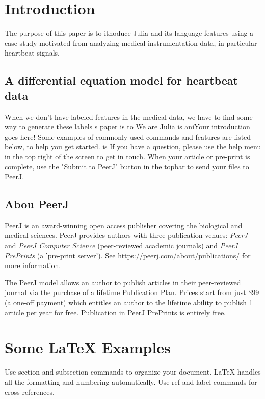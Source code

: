\documentclass[fleqn,10pt,lineno]{wlpeerj} %
\begin{document}
\section*{Introduction}

The purpose of this paper is to itnoduce Julia and its language features using a case study motivated from analyzing medical instrumentation data, in particular heartbeat signals.

\subsection{A differential equation model for heartbeat data}

When we don't have labeled features in the medical data, we have to find some way to generate these labels
s paper is to We are Julia is aniYour introduction goes here! Some examples of commonly used commands and features are listed below, to help you get started.
is
If you have a question, please use the help menu in the top right of the screen to get in touch. When your article or pre-print is complete, use the "Submit to PeerJ" button in the topbar to send your files to PeerJ.

\subsection*{Abou PeerJ}

PeerJ is an award-winning open access publisher covering the biological and medical sciences.  PeerJ provides authors with three publication venues: \textit{PeerJ} and \textit{PeerJ Computer Science} (peer-reviewed academic journals) and \textit{PeerJ PrePrints} (a 'pre-print server'). See https://peerj.com/about/publications/ for more information.

The PeerJ model allows an author to publish articles in their peer-reviewed journal via the purchase of a lifetime Publication Plan. Prices start from just \$99 (a one-off payment) which entitles an author to the lifetime ability to publish 1 article per year for free. Publication in PeerJ PrePrints is entirely free.

\section*{Some \LaTeX{} Examples}
\label{sec:examples}

Use section and subsection commands to organize your document. \LaTeX{} handles all the formatting and numbering automatically. Use ref and label commands for cross-references.
\end{document}
